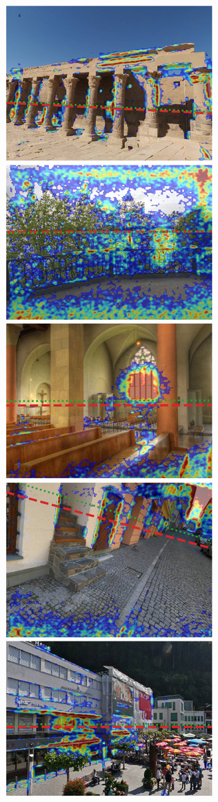 \includegraphics{sgbp/thumb/pano_addbhhhqoevobx-1.jpg}
\includegraphics{sgbp/thumb/pano_addcepusvsloks-3.jpg}
\includegraphics{sgbp/thumb/pano_addcvcjtwboiev-3.jpg}
\includegraphics{sgbp/thumb/pano_addekhyhqjvbeb-0.jpg}
\includegraphics{sgbp/thumb/pano_addfjqyibbzulh-2.jpg}
